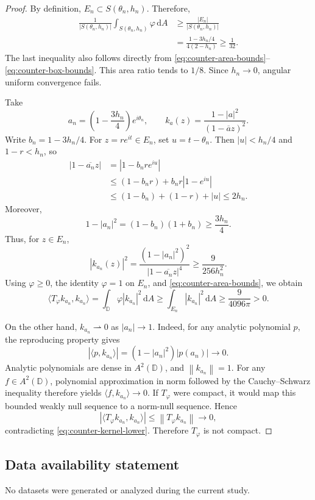 \documentclass[12pt,a4paper]{article}
\theoremstyle{remark}
\newcommand{\D}{\mathbb D}
\newcommand{\dA}{\,\mathrm dA}
\newcommand{\A}{A^2(\D)}
\newcommand{\norm}[1]{\left\lVert#1\right\rVert}
\begin{document}
\begin{proof}
\medskip

By definition, $E_n\subset S(\theta_n,h_n)$. Therefore,
\begin{align*}
\frac1{|S(\theta_n,h_n)|}\int_{S(\theta_n,h_n)}\varphi\dA
&\ge\frac{|E_n|}{|S(\theta_n,h_n)|}\\
&=\frac{1-3h_n/4}{4(2-h_n)}\ge\frac1{32}.
\end{align*}
The last inequality also follows directly from
\eqref{eq:counter-area-bounds}--\eqref{eq:counter-box-bounds}.
This area ratio tends to $1/8$.
Since $h_n\to0$, angular uniform convergence fails.

\medskip
Take
\[
a_n=\left(1-\frac{3h_n}{4}\right)e^{i\theta_n},\qquad
k_a(z)=\frac{1-|a|^2}{(1-\overline a z)^2}.
\]
Write $b_n=1-3h_n/4$. For $z=re^{it}\in E_n$,
set $u=t-\theta_n$. Then $|u|<h_n/4$ and $1-r<h_n$, so
\begin{align*}
|1-\overline{a_n}z|
&=|1-b_nr e^{iu}|\\
&\le (1-b_nr)+b_nr|1-e^{iu}|\\
&\le (1-b_n)+(1-r)+|u|\le2h_n.
\end{align*}
Moreover,
\[
1-|a_n|^2=(1-b_n)(1+b_n)\ge\frac{3h_n}{4}.
\]
Thus, for $z\in E_n$,
\[
|k_{a_n}(z)|^2
=\frac{(1-|a_n|^2)^2}{|1-\overline{a_n}z|^4}
\ge\frac{9}{256h_n^2}.
\]
Using $\varphi\ge0$, the identity $\varphi=1$ on $E_n$, and
\eqref{eq:counter-area-bounds}, we obtain
\begin{equation}\label{eq:counter-kernel-lower}
\langle T_\varphi k_{a_n},k_{a_n}\rangle
=\int_\D\varphi|k_{a_n}|^2\dA
\ge\int_{E_n}|k_{a_n}|^2\dA
\ge\frac9{4096\pi}>0.
\end{equation}

On the other hand, $k_{a_n}\rightharpoonup0$ as $|a_n|\to1$.
Indeed, for any analytic polynomial $p$, the reproducing property gives
\[
|\langle p,k_{a_n}\rangle|
=(1-|a_n|^2)|p(a_n)|\longrightarrow0.
\]
Analytic polynomials are dense in $\A$, and $\norm{k_{a_n}}=1$.
For any $f\in\A$, polynomial approximation in norm followed by the Cauchy--Schwarz inequality
therefore yields $\langle f,k_{a_n}\rangle\to0$.
If $T_\varphi$ were compact, it would map this bounded weakly null sequence to a norm-null sequence. Hence
\[
|\langle T_\varphi k_{a_n},k_{a_n}\rangle|
\le\norm{T_\varphi k_{a_n}}\longrightarrow0,
\]
contradicting \eqref{eq:counter-kernel-lower}.
Therefore $T_\varphi$ is not compact.
\end{proof}
\subsection*{Data availability statement}
No datasets were generated or analyzed during the current study.
\end{document}
